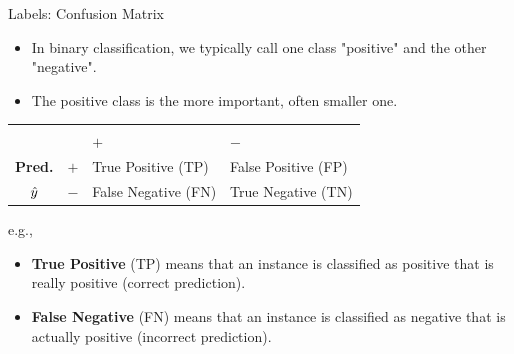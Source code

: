 \documentclass[11pt,compress,t,notes=noshow, xcolor=table]{beamer}
\begin{document}
\begin{vbframe}{Labels: Confusion Matrix}

\begin{itemize}
  \item In binary classification, we typically call one class "positive" and the 
  other "negative".
  \item The positive class is the more important, often smaller one.
\end{itemize}


\begin{center}
\small
\begin{tabular}{cc|>{\centering\arraybackslash}p{7em}>{\centering\arraybackslash}p{8em}}
    & & \multicolumn{2}{c}{\bfseries True Class $y$} \\
    & & $+$ & $-$ \\
    \hline
    \bfseries Pred.     & $+$ & True Positive (TP)  & False Positive (FP) \\
              $\hat{y}$ & $-$ & False Negative (FN) & True Negative (TN) \\
\end{tabular}
\end{center}
e.g.,
\begin{itemize}
  \item \textbf{True Positive} (TP) means that an instance is classified as 
  positive that is really positive (correct prediction).
  \item \textbf{False Negative} (FN) means that an instance is classified as 
  negative that is actually positive (incorrect prediction). 
\end{itemize}

\end{vbframe}

\end{document}
